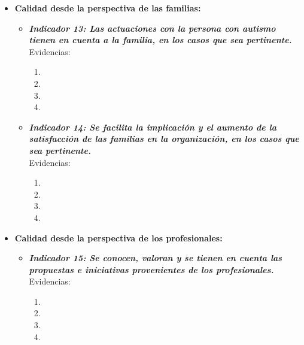 \begin{itemize}
\begin{itemize}
\begin{itemize}
\begin{itemize}
				\begin{enumerate}
					\item 
					\item 
					\item 
					\item 
				\end{enumerate}
				
			\end{itemize}
		\end{itemize}
		\item \textbf{Calidad desde la perspectiva de las familias:}
		\begin{itemize}
			\item \textbf{\textit{Indicador 13: Las actuaciones con la persona con autismo tienen en cuenta a la familia, en los casos que sea pertinente.}}\\Evidencias:
			
			\begin{enumerate}
				\item 
				\item 
				\item 
				\item 
			\end{enumerate}
			\item \textbf{\textit{Indicador 14: Se facilita la implicación y el aumento de la satisfacción de las familias en la organización, en los casos que sea pertinente.}}\\Evidencias:
			
			\begin{enumerate}
				\item 
				\item 
				\item 
				\item 
			\end{enumerate}
		\end{itemize}
		\item \textbf{Calidad desde la perspectiva de los profesionales:}
		\begin{itemize}
			\item \textbf{\textit{Indicador 15: Se conocen, valoran y se tienen en cuenta las propuestas e iniciativas provenientes de los profesionales.}}\\Evidencias:
			
			\begin{enumerate}
				\item 
				\item 
				\item 
				\item 
			\end{enumerate}
			

\end{itemize}
\end{itemize}
\end{itemize}

